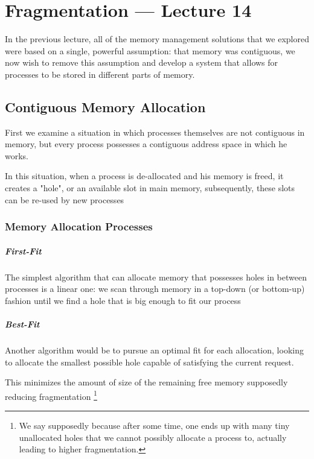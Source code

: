 \documentclass[openright, twoside]{report}
\theoremstyle{definition}
\theoremstyle{example}
\begin{document}
\chapter{Fragmentation --- Lecture 14}

In the previous lecture, all of the memory management solutions that we 
explored were based on a single, powerful assumption: that memory was 
contiguous, we now wish to remove this assumption and develop a system that 
allows for processes to be stored in different parts of memory.

\section{Contiguous Memory Allocation}

First we examine a situation in which processes themselves are not 
contiguous in memory, but every process possesses a contiguous 
address space in which he works.

In this situation, when a process is de-allocated and his memory 
is freed, it creates a "hole", or an available slot in main memory,
subsequently, these slots can be re-used by new processes 

\subsection{Memory Allocation Processes}

\paragraph{First-Fit}
	The simplest algorithm that can allocate memory that possesses 
	holes in between processes is a linear one: we scan through memory 
	in a top-down (or bottom-up) fashion until we find a hole that is 
	big enough to fit our process

\paragraph{Best-Fit}
	Another algorithm would be to pursue an optimal fit for each allocation, 
	looking to allocate the smallest possible hole capable of satisfying
	the current request.

	This minimizes the amount of size of the remaining free memory
	supposedly reducing fragmentation
	\footnote{%
		We say supposedly because after some time, one ends up with 
		many tiny unallocated holes that we cannot possibly allocate
		a process to, actually leading to higher fragmentation.
	}
\end{document}
